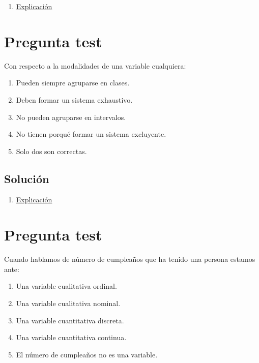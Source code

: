 \documentclass[
]{book}
\providecommand{\tightlist}{%
  \setlength{\itemsep}{0pt}\setlength{\parskip}{0pt}}
\begin{document}
\begin{enumerate}
\def\labelenumi{\alph{enumi})}
\setcounter{enumi}{2}
\tightlist
\item
  \href{https://1fjmanzano.github.io/bioestadistica/tipos-de-variables.html}{Explicación}
\end{enumerate}

\hypertarget{pregunta-test-13}{%
\section{Pregunta test}\label{pregunta-test-13}}

Con respecto a la modalidades de una variable cualquiera:

\begin{enumerate}
\def\labelenumi{\alph{enumi})}
\tightlist
\item
  Pueden siempre agruparse en clases.
\item
  Deben formar un sistema exhaustivo.
\item
  No pueden agruparse en intervalos.
\item
  No tienen porqué formar un sistema excluyente.
\item
  Solo dos son correctas.
\end{enumerate}

\hypertarget{soluciuxf3n-15}{%
\subsection{Solución}\label{soluciuxf3n-15}}

\begin{enumerate}
\def\labelenumi{\alph{enumi})}
\setcounter{enumi}{1}
\tightlist
\item
  \href{https://1fjmanzano.github.io/bioestadistica/tipos-de-variables.html}{Explicación}
\end{enumerate}

\hypertarget{pregunta-test-14}{%
\section{Pregunta test}\label{pregunta-test-14}}

Cuando hablamos de número de cumpleaños que ha tenido una persona estamos ante:

\begin{enumerate}
\def\labelenumi{\alph{enumi})}
\tightlist
\item
  Una variable cualitativa ordinal.
\item
  Una variable cualitativa nominal.
\item
  Una variable cuantitativa discreta.
\item
  Una variable cuantitativa continua.
\item
  El número de cumpleaños no es una variable.
\end{enumerate}
\end{document}
